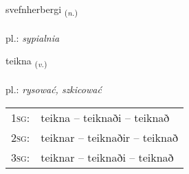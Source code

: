 \documentclass[frontgrid, backgrid]{flacards}\usepackage[]{graphicx}\usepackage[]{xcolor}
\begin{document}
\renewcommand{\flhead}{\vskip5pt \fboxsep=0pt {\small\bfseries\footnotesize Nafnorð | rzeczownik}}
\renewcommand{\fcfoot}{\vskip5pt \fboxsep=0pt \hspace{2pt}{\small\bfseries\footnotesize 3K}}

\renewcommand{\blhead}{\vskip5pt {\small\bfseries\footnotesize Nafnorð | rzeczownik }}
\renewcommand{\bcfoot}{\vskip5pt \hspace{2pt}{\small\bfseries\footnotesize 3K}}


{svefnherbergi \small{\textsubscript{(\textit{n.})}} \\[1ex] %
 \\
pl.: \emph{sypialnia} \\  [2ex]
\renewcommand*{\arraystretch}{0.8}
}

\renewcommand{\flhead}{\vskip5pt \fboxsep=0pt {\small\bfseries\footnotesize Sagnorð | czasownik}}
\renewcommand{\fcfoot}{\vskip5pt \fboxsep=0pt \hspace{2pt}{\small\bfseries\footnotesize 3K}}

\renewcommand{\blhead}{\vskip5pt {\small\bfseries\footnotesize Sagnorð | czasownik }}
\renewcommand{\bcfoot}{\vskip5pt \hspace{2pt}{\small\bfseries\footnotesize 3K}}


{teikna \small{\textsubscript{(\textit{v.})}} \\[1ex] %
\textphonetic{[tʰeihkna]} \\
pl.: \emph{rysować, szkicować} \\  [2ex]
\renewcommand*{\arraystretch}{0.8}
\begin{tabular}{p{1cm}l}
\textsc{1sg}: & teikna -- teiknaði -- teiknað \\ 
\textsc{2sg}: & teiknar -- teiknaðir -- teiknað \\ 
\textsc{3sg}: & teiknar -- teiknaði -- teiknað \\ 
\end{tabular}
}
\end{document}
